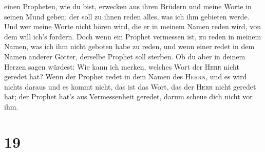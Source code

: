einen Propheten, wie du bist, erwecken aus ihren Brüdern und meine Worte
in seinen Mund geben; der soll zu ihnen reden alles, was ich ihm
gebieten werde.  Und wer meine Worte nicht hören wird,
die er in meinem Namen reden wird, von dem will ich's fordern.
 Doch wenn ein Prophet vermessen ist, zu reden in meinem
Namen, was ich ihm nicht geboten habe zu reden, und wenn einer redet in
dem Namen anderer Götter, derselbe Prophet soll sterben. 
Ob du aber in deinem Herzen sagen würdest: Wie kann ich merken, welches
Wort der \textsc{Herr} nicht geredet hat?  Wenn der
Prophet redet in dem Namen des \textsc{Herrn}, und es wird nichts daraus
und es kommt nicht, das ist das Wort, das der \textsc{Herr} nicht
geredet hat; der Prophet hat's aus Vermessenheit geredet, darum scheue
dich nicht vor ihm.

\hypertarget{section-18}{%
\section{19}\label{section-18}}


